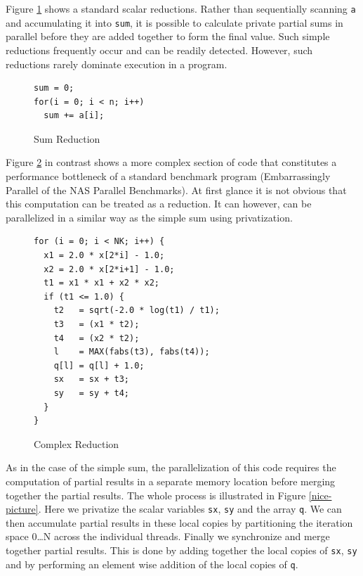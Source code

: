 Figure \ref{sum-figure} shows a standard scalar reductions.  Rather
than sequentially scanning {\tt a} and accumulating it into {\tt sum},
it is possible to calculate private partial sums in parallel before
they are added together to form the final value.  Such simple
reductions frequently occur and can be readily detected.  However,
such reductions rarely dominate execution in a program.

\begin{figure}[ht]
\begin{lstlisting}
sum = 0;
for(i = 0; i < n; i++)
  sum += a[i];
\end{lstlisting}
\caption{Sum Reduction}
\label{sum-figure}
\end{figure}


Figure \ref{complex-reduction-figure} in contrast shows a more complex section
of code that constitutes a performance bottleneck of a standard benchmark
program (Embarrassingly Parallel of the NAS Parallel Benchmarks).
At first glance it is not obvious that this computation can be treated as a reduction.
It can however, can be parallelized in a similar way as the simple sum using privatization.

\begin{figure}[ht]
\begin{lstlisting}
for (i = 0; i < NK; i++) {
  x1 = 2.0 * x[2*i] - 1.0;
  x2 = 2.0 * x[2*i+1] - 1.0;
  t1 = x1 * x1 + x2 * x2;
  if (t1 <= 1.0) {
    t2   = sqrt(-2.0 * log(t1) / t1);
    t3   = (x1 * t2);
    t4   = (x2 * t2);
    l    = MAX(fabs(t3), fabs(t4));
    q[l] = q[l] + 1.0;
    sx   = sx + t3;
    sy   = sy + t4;
  }
}
\end{lstlisting}
\caption{Complex Reduction}
\label{complex-reduction-figure}
\end{figure}

As in the case of the simple sum, the parallelization of this code
requires the computation of partial results in a separate memory
location before merging together the partial results. 
 The whole process is illustrated
in Figure \ref{nice-picture}.
Here  we privatize the scalar variables \texttt{sx}, \texttt{sy}
and the array \texttt{q}.  We can then accumulate partial results in
these local copies by partitioning the iteration space 0{\dots}N across 
the individual threads.  Finally we synchronize and  merge together partial
results.  This is done by adding together the local copies
of \texttt{sx}, \texttt{sy} and by performing an element wise addition
of the local copies of \texttt{q}. 

